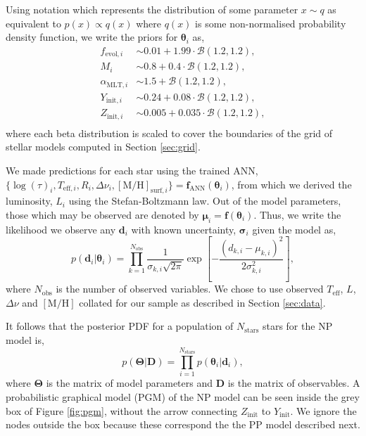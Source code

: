 \documentclass[a4paper,fleqn,usenatbib]{mnras}
\newcommand{\dnu}{\ensuremath{\Delta\nu}}
\newcommand{\metallicity}{\ensuremath{[\mathrm{M}/\mathrm{H}]}}
\newcommand{\teff}{\ensuremath{T_\mathrm{eff}}}
\begin{document}
Using notation which represents the distribution of some parameter $x \sim q$ as equivalent to $p(x) \propto q(x)$ where $q(x)$ is some non-normalised probability density function, we write the priors for $\boldsymbol{\theta}_i$ as,
%
\begin{align*}
    f_{\mathrm{evol}, i} &\sim 0.01 + 1.99 \cdot \mathcal{B}(1.2, 1.2),\\
    M_i &\sim 0.8 + 0.4 \cdot \mathcal{B}(1.2, 1.2),\\
    \alpha_{\mathrm{MLT}, i} &\sim 1.5 + \mathcal{B}(1.2, 1.2),\\
    Y_{\mathrm{init}, i} &\sim 0.24 + 0.08 \cdot \mathcal{B}(1.2, 1.2),\\
    Z_{\mathrm{init}, i} &\sim 0.005 + 0.035 \cdot \mathcal{B}(1.2, 1.2),\\
\end{align*}
%
where each beta distribution is scaled to cover the boundaries of the grid of stellar models computed in Section \ref{sec:grid}.

We made predictions for each star using the trained ANN, $\{\log(\tau)_i, T_{\mathrm{eff}, i}, R_i, \dnu_i, \metallicity_{\mathrm{surf}, i}\} = \boldsymbol{f}_{\mathrm{ANN}}(\boldsymbol{\theta}_i)$, from which we derived the luminosity, $L_i$ using the Stefan-Boltzmann law. Out of the model parameters, those which may be observed are denoted by ${\boldsymbol{\mu}}_{i} = {\boldsymbol{f}}(\boldsymbol{\theta}_i)$. Thus, we write the likelihood we observe any $\boldsymbol{d}_i$ with known uncertainty, $\boldsymbol{\sigma}_{i}$ given the model as,
%
\begin{equation}
    p(\boldsymbol{d}_i | \boldsymbol{\theta}_i) = \prod_{k=1}^{N_\mathrm{obs}} \frac{1}{\sigma_{k, i} \sqrt{2\pi}} \exp\left[ - \frac{(d_{k, i} - \mu_{k, i})^2}{2 \sigma_{k, i}^2} \right],
    \label{eq:like}
\end{equation}
%
where $N_\mathrm{obs}$ is the number of observed variables. We chose to use observed $\teff$, $L$, $\dnu$ and $\metallicity$ collated for our sample as described in Section \ref{sec:data}.

It follows that the posterior PDF for a population of $N_\mathrm{stars}$ stars for the NP model is, 
%
\begin{equation}
    p(\boldsymbol{\Theta} | \boldsymbol{D}) = \prod_{i=1}^{N_{\mathrm{stars}}} p(\boldsymbol{\theta}_i | \boldsymbol{d}_i),   
\end{equation}
%
where $\boldsymbol{\Theta}$ is the matrix of model parameters and $\boldsymbol{D}$ is the matrix of observables. A probabilistic graphical model (PGM) of the NP model can be seen inside the grey box of Figure \ref{fig:pgm}, without the arrow connecting $Z_\mathrm{init}$ to $Y_\mathrm{init}$. We ignore the nodes outside the box because these correspond the the PP model described next.
\end{document}
